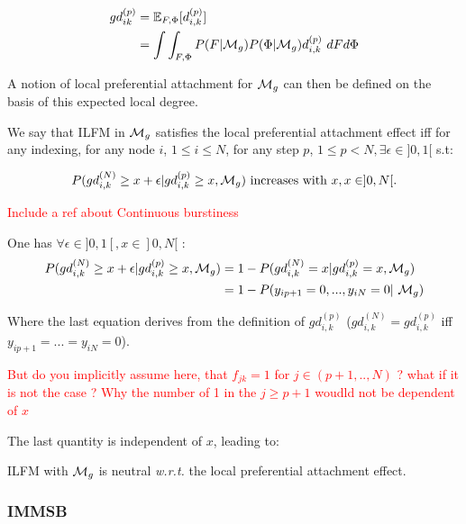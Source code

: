 \begin{align*}
gd_{ik}^{(p)} &= \mathbb{E}_{F,\Phi}[d_{i,k}^{(p)}] \\
    &= \int\int_{F, \Phi} P(F|\mathcal{M}_g)P(\Phi|\mathcal{M}_g) d_{i,k}^{(p)}\ dF d\Phi
\end{align*}

A notion of local preferential attachment for $\mathcal{M}_g$ can then be defined on the basis of this expected local degree.

\begin{definition}
We say that ILFM in $\mathcal{M}_g$ satisfies the local preferential attachment effect iff for any indexing, for any node $i$, $1 \leq i \leq N$, for any step $p$, $1 \leq p < N, \exists \epsilon \in ]0,1[$ s.t:

\begin{equation*}
P(gd_{i,k}^{(N)} \geq x + \epsilon | gd_{i,k}^{(p)} \geq x, \mathcal{M}_g) \textrm{ increases with } x, x \in ]0,N[.
\end{equation*}

\end{definition}

\textcolor{red}{Include a ref about Continuous burstiness}

One has $\forall \epsilon \in ]0,1[, x \in ]0,N[$ :
\begin{align*}
P(gd_{i,k}^{(N)} \geq x + \epsilon | gd_{i,k}^{(p)} \geq x, \M_g) &= 1 - P(gd_{i,k}^{(N)} =x | gd_{i,k}^{(p)} = x, \M_g) \\
    &= 1 - P(y_{ip+1}=0, ..., y_{iN}=0  | \M_g)
\end{align*}

Where the last equation derives from the definition of $gd_{i,k}^{(p)}$ ($gd_{i,k}^{(N)} = gd_{i,k}^{(p)}$ iff $y_{ip+1}=...=y_{iN}=0$).

\textcolor{red}{But do you implicitly assume here, that $f_{jk}=1$ for $j \in (p+1,.., N)$ ? what if it is not the case ? Why the number of 1 in the $j \geq p+1$ woudld not be dependent of $x$}

The last quantity is independent of $x$, leading to:

\begin{proposition}
ILFM with $\mathcal{M}_g$ is neutral \textit{w.r.t.} the local preferential attachment effect.

\end{proposition}

\subsubsection{IMMSB}


